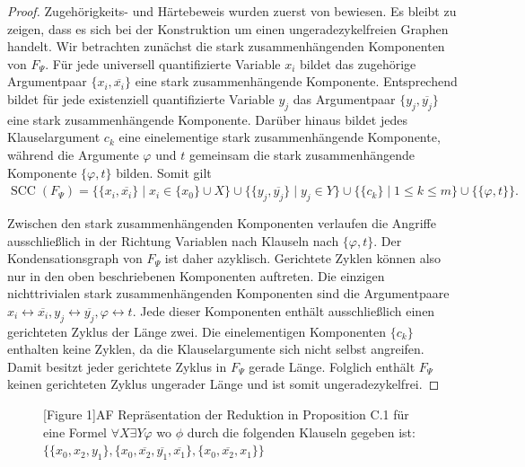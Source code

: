 \begin{proof}
    \label{pr:ocf-af-ci-st-pi^2-is-correct}
    Zugehörigkeits- und Härtebeweis wurden zuerst von \textcite{bluemel:2025:independence-aba} bewiesen. 
    Es bleibt zu zeigen, dass es sich bei der Konstruktion um einen ungeradezykelfreien Graphen handelt.
    Wir betrachten zunächst die stark zusammenhängenden Komponenten von \(F_{\Psi}\). 
    Für jede universell quantifizierte Variable \(x_i\) bildet das zugehörige Argumentpaar 
    \(\{x_i,\overline{x_i}\}\) eine stark zusammenhängende Komponente. Entsprechend bildet 
    für jede existenziell quantifizierte Variable \(y_j\) das Argumentpaar 
    \(\{y_j,\overline{y_j}\}\) eine stark zusammenhängende Komponente. Darüber hinaus bildet 
    jedes Klauselargument \(c_k\) eine einelementige stark zusammenhängende Komponente, während 
    die Argumente \(\varphi\) und \(t\) gemeinsam die stark zusammenhängende Komponente 
    \(\{\varphi,t\}\) bilden.
    Somit gilt
       \( \operatorname{SCC}(F_{\Psi})
        =
        \bigl\{\{x_i,\overline{x_i}\} \mid x_i \in \{x_0\} \cup X\bigr\}
        \cup
        \bigl\{\{y_j,\overline{y_j}\} \mid y_j \in Y\bigr\}
        \cup
        \bigl\{\{c_k\} \mid 1 \leq k \leq m\bigr\}
        \cup
        \bigl\{\{\varphi,t\}\bigr\}.\)

    Zwischen den stark zusammenhängenden Komponenten verlaufen die Angriffe ausschließlich 
    in der Richtung Variablen nach Klauseln nach \(\{\varphi, t\}\). Der Kondensationsgraph von \(F_{\Psi}\) ist daher azyklisch.
    Gerichtete Zyklen können also nur in den oben beschriebenen Komponenten auftreten.
    Die einzigen nichttrivialen stark zusammenhängenden Komponenten sind die Argumentpaare
        \(x_i \leftrightarrow \overline{x_i},
        y_j \leftrightarrow \overline{y_j},
        \varphi \leftrightarrow t.\)
    Jede dieser Komponenten enthält ausschließlich einen gerichteten Zyklus der Länge zwei. 
    Die einelementigen Komponenten \(\{c_k\}\) enthalten keine Zyklen, da die Klauselargumente 
    sich nicht selbst angreifen.
    Damit besitzt jeder gerichtete Zyklus in \(F_{\Psi}\) gerade Länge. Folglich enthält 
    \(F_{\Psi}\) keinen gerichteten Zyklus ungerader Länge und ist somit ungeradezykelfrei.
\end{proof}

\begin{figure}
    \centering
    \resizebox{\textwidth}{!}{
        
    }
    \caption{\cite{bluemel:2025:independence-aba}[Figure 1]AF Repräsentation der Reduktion in Proposition C.1 für eine Formel 
    \(\forall X \exists Y \varphi\) wo \(\phi\) durch die folgenden Klauseln gegeben ist: \(\{\{x_0, x_2, y_1\}, \{x_0, \overline{x_2}, \overline{y_1}, \overline{x_1}\},
    \{x_0, \overline{x_2}, x_1\}\}\)}
    \label{fig:reduktion-stable}
\end{figure}



